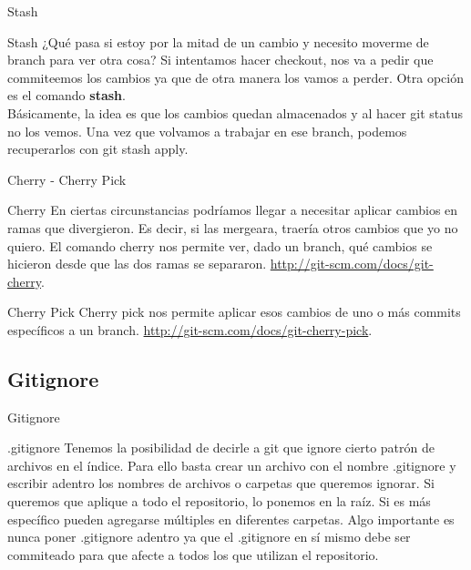 \documentclass{beamer}
\begin{document}
\begin{frame}{Stash}
  \begin{block}{Stash}
  ¿Qué pasa si estoy por la mitad de un cambio y necesito moverme de branch para ver otra cosa? Si intentamos
  hacer checkout, nos va a pedir que commiteemos los cambios ya que de otra manera los vamos a perder. Otra opción
  es el comando \textbf{stash}. \footnotemark \\
  Básicamente, la idea es que los cambios quedan almacenados y al hacer git status no los vemos. Una vez que volvamos
  a trabajar en ese branch, podemos recuperarlos con git stash apply.
  \end{block}
  
\end{frame}

\begin{frame}{Cherry - Cherry Pick}
  \begin{block}{Cherry}
  En ciertas circunstancias podríamos llegar a necesitar aplicar cambios en ramas que divergieron. Es decir, si 
  las mergeara, traería otros cambios que yo no quiero. El comando cherry nos permite ver, dado un branch, qué cambios
  se hicieron desde que las dos ramas se separaron. \url{http://git-scm.com/docs/git-cherry}.
  \end{block}
  \pause
  \begin{block}{Cherry Pick}
  Cherry pick nos permite aplicar esos cambios de uno o más commits específicos a un branch. \url{http://git-scm.com/docs/git-cherry-pick}.
  \end{block}
\end{frame}

\subsection{Gitignore}

\begin{frame}{Gitignore}
  \begin{block}{.gitignore}
      Tenemos la posibilidad de decirle a git que ignore cierto patrón de archivos en el índice. Para ello basta crear un archivo con el nombre .gitignore
      y escribir adentro los nombres de archivos o carpetas que queremos ignorar. Si queremos que aplique a todo el repositorio, lo ponemos en la raíz.
      Si es más específico pueden agregarse múltiples en diferentes carpetas. Algo importante es nunca poner .gitignore adentro ya que el .gitignore en
      sí mismo debe ser commiteado para que afecte a todos los que utilizan el repositorio.
  \end{block}

\end{frame}
\end{document}
